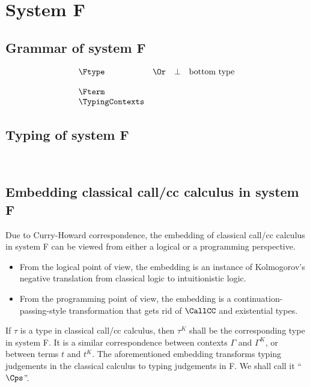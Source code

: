 \documentclass{amsart}
\begin{document}
\FRules

\ExistentialIntroduction

\ExistentialElimination

\DoubleNegationElimination

\section{System F}

\subsection{Grammar of system F}

\[
\begin{array}{lclr}
\Ftype
&\Or& \bot & \mbox{bottom type} \\
\\
\Fterm
\\
\TypingContexts
\end{array}
\]

\subsection{Typing of system F}
~

\FRules

\subsection{Embedding classical call/cc calculus in system F}

Due to Curry-Howard correspondence, the embedding of classical
call/cc calculus in system F can be viewed from either a
logical or a programming perspective.
\begin{itemize}
\item From the logical point of view, the embedding is an
instance of Kolmogorov's negative translation from classical
logic to intuitionistic logic.
\item From the programming point of view, the embedding is a
continuation-passing-style transformation that gets rid of
$\CallCC$ and existential types.
\end{itemize}
If $\tau$ is a type in classical call/cc calculus, then $\tau^K$
shall be the corresponding type in system F. It is a similar
correspondence between contexts $\Gamma$ and $\Gamma^K$, or
between terms $t$ and $t^K$. The aforementioned embedding
transforms typing judgements in the classical calculus to typing
judgements in F. We shall call it ``$\Cps$''.
\end{document}
